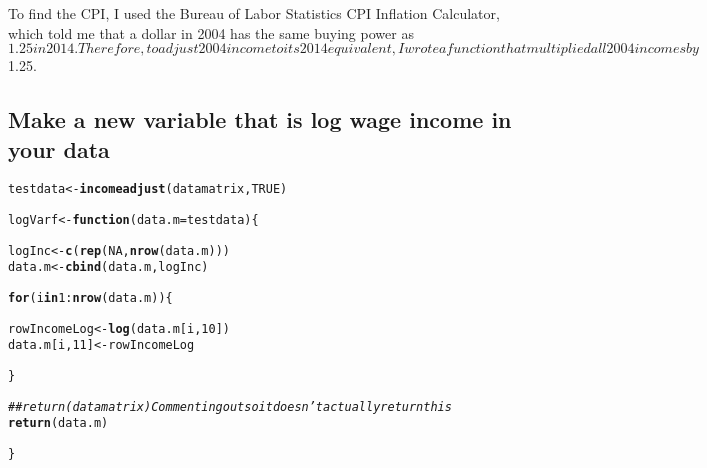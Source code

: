 \documentclass{article}\usepackage[]{graphicx}\usepackage[]{color}
\makeatletter
\newcommand{\hlnum}[1]{\textcolor[rgb]{0.686,0.059,0.569}{#1}}%
\newcommand{\hlcom}[1]{\textcolor[rgb]{0.678,0.584,0.686}{\textit{#1}}}%
\newcommand{\hlopt}[1]{\textcolor[rgb]{0,0,0}{#1}}%
\newcommand{\hlstd}[1]{\textcolor[rgb]{0.345,0.345,0.345}{#1}}%
\newcommand{\hlkwa}[1]{\textcolor[rgb]{0.161,0.373,0.58}{\textbf{#1}}}%
\newcommand{\hlkwb}[1]{\textcolor[rgb]{0.69,0.353,0.396}{#1}}%
\newcommand{\hlkwc}[1]{\textcolor[rgb]{0.333,0.667,0.333}{#1}}%
\newcommand{\hlkwd}[1]{\textcolor[rgb]{0.737,0.353,0.396}{\textbf{#1}}}%
\newenvironment{kframe}{%
 \def\at@end@of@kframe{}%
 \ifinner\ifhmode%
  \def\at@end@of@kframe{\end{minipage}}%
  \begin{minipage}{\columnwidth}%
 \fi\fi%
 \def\FrameCommand##1{\hskip\@totalleftmargin \hskip-\fboxsep
 \colorbox{shadecolor}{##1}\hskip-\fboxsep
     \hskip-\linewidth \hskip-\@totalleftmargin \hskip\columnwidth}%
 \MakeFramed {\advance\hsize-\width
   \@totalleftmargin\z@ \linewidth\hsize
   \@setminipage}}%
 {\par\unskip\endMakeFramed%
 \at@end@of@kframe}
\newenvironment{knitrout}{}{} %
\makeatother
\begin{document}
To find the CPI, I used the Bureau of Labor Statistics CPI Inflation Calculator, which told me that a dollar in 2004 has the same buying power as $1.25 in 2014. Therefore, to adjust 2004 income to its 2014 equivalent, I wrote a function that multiplied all 2004 incomes by $1.25.

\subsection{Make a new variable that is log wage income in your data}

\begin{knitrout}\scriptsize
{}\color{fgcolor}\begin{kframe}
\begin{alltt}
\hlstd{testdata} \hlkwb{<-} \hlkwd{incomeadjust}\hlstd{(datamatrix,} \hlnum{TRUE}\hlstd{)}

\hlstd{logVarf} \hlkwb{<-} \hlkwa{function}\hlstd{(}\hlkwc{data.m} \hlstd{= testdata)\{}

  \hlstd{logInc} \hlkwb{<-} \hlkwd{c}\hlstd{(}\hlkwd{rep}\hlstd{(}\hlnum{NA}\hlstd{,} \hlkwd{nrow}\hlstd{(data.m)))}
  \hlstd{data.m} \hlkwb{<-} \hlkwd{cbind}\hlstd{(data.m, logInc)}

  \hlkwa{for} \hlstd{(i} \hlkwa{in} \hlnum{1}\hlopt{:}\hlkwd{nrow}\hlstd{(data.m))\{}

    \hlstd{rowIncomeLog} \hlkwb{<-} \hlkwd{log}\hlstd{(data.m[i,}\hlnum{10}\hlstd{])}
    \hlstd{data.m[i,}\hlnum{11}\hlstd{]} \hlkwb{<-} \hlstd{rowIncomeLog}

  \hlstd{\}}

  \hlcom{## return(datamatrix) Commenting out so it doesn't actually return this}
  \hlkwd{return}\hlstd{(data.m)}

\hlstd{\}}


\end{alltt}
\end{kframe}
\end{knitrout}
\end{document}
